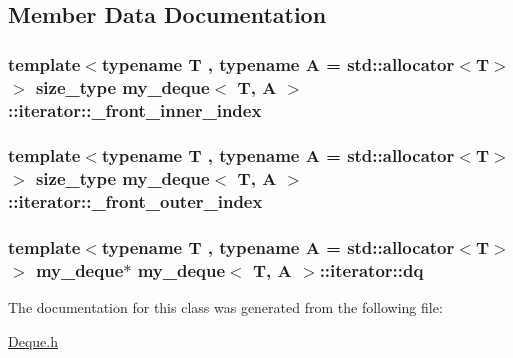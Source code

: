 \subsection{Member Data Documentation}
\hypertarget{classmy__deque_1_1iterator_a384bcfc2da11135412c0211261464f95}{
\subsubsection[{\-\_\-front\-\_\-inner\-\_\-index}]{\setlength{\rightskip}{0pt plus 5cm}template$<$typename T , typename A  = std\-::allocator$<$\-T$>$$>$ {\bf size\-\_\-type} {\bf my\-\_\-deque}$<$ T, A $>$\-::iterator\-::\-\_\-front\-\_\-inner\-\_\-index\hspace{0.3cm}{\ttfamily [private]}}}\label{classmy__deque_1_1iterator_a384bcfc2da11135412c0211261464f95}
\hypertarget{classmy__deque_1_1iterator_a418fb5071b8437c9a0259ad1cb19aeb8}{
\subsubsection[{\-\_\-front\-\_\-outer\-\_\-index}]{\setlength{\rightskip}{0pt plus 5cm}template$<$typename T , typename A  = std\-::allocator$<$\-T$>$$>$ {\bf size\-\_\-type} {\bf my\-\_\-deque}$<$ T, A $>$\-::iterator\-::\-\_\-front\-\_\-outer\-\_\-index\hspace{0.3cm}{\ttfamily [private]}}}\label{classmy__deque_1_1iterator_a418fb5071b8437c9a0259ad1cb19aeb8}
\hypertarget{classmy__deque_1_1iterator_a00058b213271faa0b36b8e8137d015f1}{
\subsubsection[{dq}]{\setlength{\rightskip}{0pt plus 5cm}template$<$typename T , typename A  = std\-::allocator$<$\-T$>$$>$ {\bf my\-\_\-deque}$\ast$ {\bf my\-\_\-deque}$<$ T, A $>$\-::iterator\-::dq\hspace{0.3cm}{\ttfamily [private]}}}\label{classmy__deque_1_1iterator_a00058b213271faa0b36b8e8137d015f1}


The documentation for this class was generated from the following file\-:\begin{DoxyCompactItemize}
\item 
\hyperlink{Deque_8h}{Deque.\-h}\end{DoxyCompactItemize}
